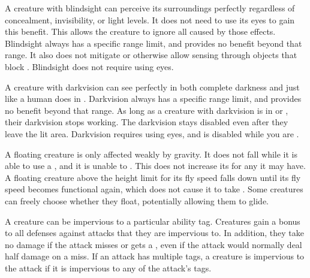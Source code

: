   A creature with blindsight can perceive its surroundings perfectly regardless of concealment, invisibility, or light levels.
  It does not need to use its eyes to gain this benefit.
  This allows the creature to ignore all  caused by those effects.
  Blindsight always has a specific range limit, and provides no benefit beyond that range.
  It also does not mitigate  or otherwise allow sensing through objects that block .
  Blindsight does not require using eyes.

  A creature with darkvision can see perfectly in both complete darkness and  just like a human does in .
  Darkvision always has a specific range limit, and provides no benefit beyond that range.
  As long as a creature with darkvision is in  or , their darkvision stops working.
  The darkvision  stays disabled even after they leave the lit area.
  Darkvision requires using eyes, and is disabled while you are \dazzled.

  A floating creature is only affected weakly by gravity.
  It does not fall while it is able to use a , and it is unable to .
  This does not increase its  for any  it may have.
  A floating creature above the height limit for its fly speed falls down until its fly speed becomes functional again, which does not cause it to take .
  Some creatures can freely choose whether they float, potentially allowing them to glide.

  A creature can be impervious to a particular ability tag.
  Creatures gain a  bonus to all defenses against attacks that they are impervious to.
  In addition, they take no damage if the attack misses or gets a , even if the attack would normally deal half damage on a miss.
  If an attack has multiple tags, a creature is impervious to the attack if it is impervious to any of the attack's tags.

